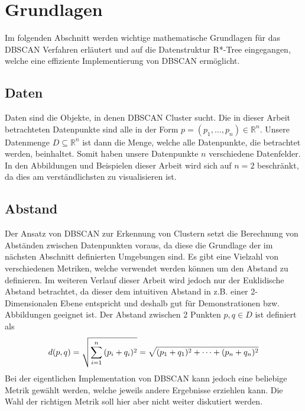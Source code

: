 \documentclass{lni}
\begin{document}
%
%

\section{Grundlagen}
\label{sec:grund}
Im folgenden Abschnitt werden wichtige mathematische Grundlagen für das DBSCAN Verfahren erläutert und auf die Datenstruktur R*-Tree eingegangen, welche eine effiziente Implementierung von DBSCAN ermöglicht.


\subsection{Daten}
Daten sind die Objekte, in denen DBSCAN Cluster sucht. Die in dieser Arbeit betrachteten Datenpunkte sind alle in der Form $p = (p_1, \dots, p_n) \in \mathbb{R}^n$.
Unsere Datenmenge $D \subseteq \mathbb{R}^n$ ist dann die Menge, welche alle Datenpunkte, die betrachtet werden, beinhaltet. Somit haben unsere Datenpunkte $n$ verschiedene Datenfelder. In den Abbildungen und Beispielen dieser Arbeit wird sich auf $n=2$ beschränkt, da dies am verständlichsten zu visualisieren ist.


\subsection{Abstand}
\label{sec:abstand}
Der Ansatz von DBSCAN zur Erkennung von Clustern setzt die Berechnung von Abständen zwischen Datenpunkten voraus, da diese die Grundlage der im nächsten Abschnitt definierten Umgebungen sind. Es gibt eine Vielzahl von verschiedenen Metriken, welche verwendet werden können um den Abstand zu definieren. Im weiteren Verlauf dieser Arbeit wird jedoch nur der Euklidische Abstand betrachtet, da dieser dem intuitiven Abstand in z.B. einer 2-Dimensionalen Ebene entspricht und deshalb gut für Demonstrationen bzw. Abbildungen geeignet ist. Der Abstand zwischen 2 Punkten $p,q \in D$ ist definiert als
\begin{align}
    d(p,q) = \sqrt{\sum_{i=1}^{n}{(p_i+q_i)^2}} = \sqrt{(p_1+q_1)^2 + \dots + (p_n+q_n)^2} \notag
\end{align}
Bei der eigentlichen Implementation von DBSCAN kann jedoch eine beliebige Metrik gewählt werden, welche jeweils andere Ergebnisse erziehlen kann.
Die Wahl der richtigen Metrik soll hier aber nicht weiter diskutiert werden.

\end{document}
